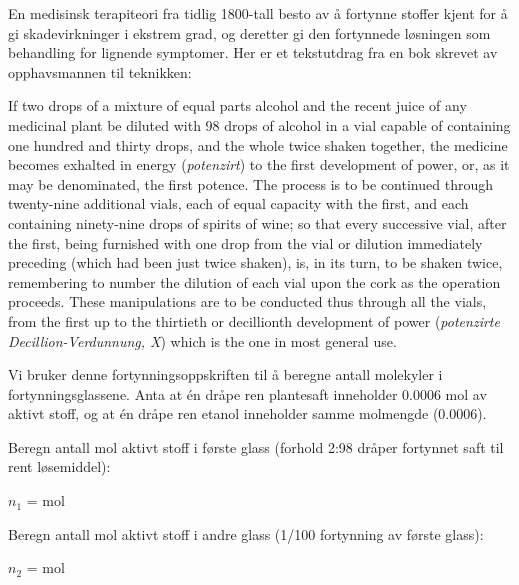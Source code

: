 

En medisinsk terapiteori fra tidlig 1800-tall besto av å fortynne stoffer kjent for å gi skadevirkninger i ekstrem grad, og deretter gi den fortynnede løsningen som behandling for lignende symptomer. Her er et tekstutdrag fra en bok skrevet av opphavsmannen til teknikken:

\vskip 10pt {\narrower \noindent \baselineskip5pt

If two drops of a mixture of equal parts alcohol and the recent juice of any medicinal plant be diluted with 98 drops of alcohol in a vial capable of containing one hundred and thirty drops, and the whole twice shaken together, the medicine becomes exhalted in energy ({\it potenzirt}) to the first development of power, or, as it may be denominated, the first potence.  The process is to be continued through twenty-nine additional vials, each of equal capacity with the first, and each containing ninety-nine drops of spirits of wine; so that every successive vial, after the first, being furnished with one drop from the vial or dilution immediately preceding (which had been just twice shaken), is, in its turn, to be shaken twice, remembering to number the dilution of each vial upon the cork as the operation proceeds.  These manipulations are to be conducted thus through all the vials, from the first up to the thirtieth or decillionth development of power ({\it potenzirte Decillion-Verdunnung, X}) which is the one in most general use.

\par} \vskip 10pt

Vi bruker denne fortynningsoppskriften til å beregne antall molekyler i fortynningsglassene. Anta at én dråpe ren plantesaft inneholder 0.0006 mol av aktivt stoff, og at én dråpe ren etanol inneholder samme molmengde (0.0006).

\vskip 20pt

Beregn antall mol aktivt stoff i første glass (forhold 2:98 dråper fortynnet saft til rent løsemiddel):

$n_1$ = \underbar{\hskip 50pt} mol

\vskip 20pt

Beregn antall mol aktivt stoff i andre glass (1/100 fortynning av første glass):

$n_2$ = \underbar{\hskip 50pt} mol

